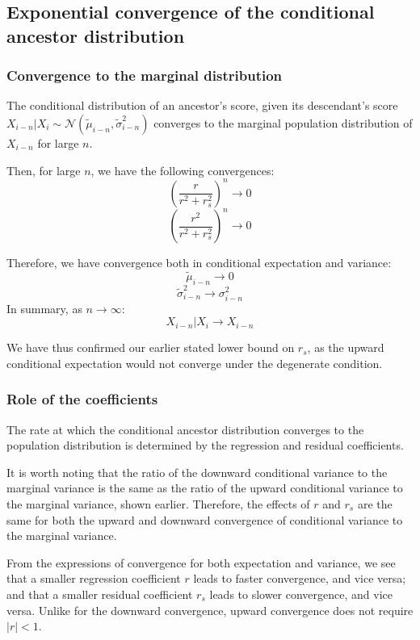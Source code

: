 \documentclass[a4paper,11pt]{article} %
\begin{document}
\subsection{Exponential convergence of the conditional ancestor distribution}

\subsubsection*{Convergence to the marginal distribution}
The conditional distribution of an ancestor's score, given its descendant's score $X_{i-n}|X_i \sim \mathcal{N}( \tilde{\mu}_{i-n}, \tilde{\sigma}_{i-n}^2)$ converges to the marginal population distribution of $X_{i-n}$ for large $n$.

Then, for large $n$, we have the following convergences:
$$(\frac{r}{r^2+r_s^2})^n \rightarrow 0$$
$$(\frac{r^2}{r^2+r_s^2})^n \rightarrow 0$$

Therefore, we have convergence both in conditional expectation and variance:
$$\tilde{\mu}_{i-n} \rightarrow 0$$
$$\tilde{\sigma}_{i-n}^2 \rightarrow \sigma_{i-n}^2$$
In summary, as $n \rightarrow \infty$:
$$X_{i-n}|X_i \rightarrow X_{i-n}$$

We have thus confirmed our earlier stated lower bound on $r_s$, as the upward conditional expectation would not converge under the degenerate condition.


\subsubsection*{Role of the coefficients}
The rate at which the conditional ancestor distribution converges to the population distribution is determined by the regression and residual coefficients. 

It is worth noting that the ratio of the downward conditional variance to the marginal variance is the same as the ratio of the upward conditional variance to the marginal variance, shown earlier. Therefore, the effects of $r$ and $r_s$ are the same for both the upward and downward convergence of conditional variance to the marginal variance.

From the expressions of convergence for both expectation and variance, we see that a smaller regression coefficient $r$ leads to faster convergence, and vice versa; and that a smaller residual coefficient $r_s$ leads to slower convergence, and vice versa. Unlike for the downward convergence, upward convergence does not require $|r| < 1$.
\end{document}

